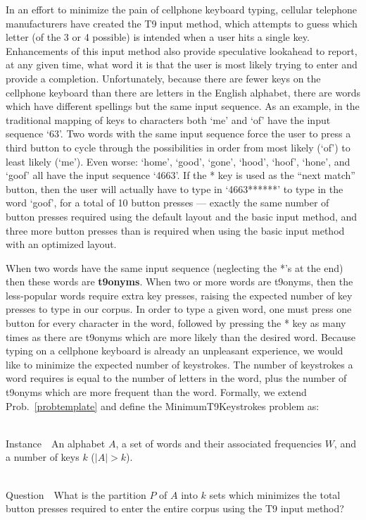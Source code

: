 \documentclass[runningheads]{llncs}
\newcommand{\newword}[1]{{\bf #1}}
\newcommand{\Instance}{{\sc Instance~}}
\newcommand{\Question}{~\\
{\sc Question~}}
\begin{document}
In an effort to minimize the pain of cellphone keyboard typing, cellular
telephone manufacturers have created the T9 input method, which attempts to
guess which letter (of the 3 or 4 possible) is intended when a user hits a
single key.  Enhancements of this input method also provide
speculative lookahead to report, at any given time, what word it is
that the user is most likely trying to enter and provide a completion.
Unfortunately, because there are fewer keys on the cellphone keyboard than
there are letters in the English alphabet, there are words which have different
spellings but the same input sequence.  As an example, in the traditional
mapping of keys to characters both `me' and `of' have the input sequence
`63'.  Two words with the same input sequence force the user to press a third
button to cycle through the possibilities in order from most likely (`of') to
least likely (`me').  Even worse: `home', `good', `gone', `hood',
`hoof', `hone', and `goof' all have the input sequence `4663'.  If
the * key is used as the ``next match'' button, then the user will actually
have to type in `4663******' to type in the word `goof', for a total of 10
button presses --- exactly the same number of button presses required using the
default layout and the basic input method, and three more button presses than
is required when using the basic input method with an optimized layout.

When two words have the same input sequence (neglecting the *'s at the end)
then these words are \newword{t9onyms}.  When two or more words are t9onyms,
then the less-popular words require extra key presses, raising the expected
number of key presses to type in our corpus.  In order to type a given word, one
must press one button for every character in the word, followed by pressing
the * key as many times as there are t9onyms which are more likely than the
desired word.  Because typing on a cellphone keyboard is already an unpleasant
experience, we would like to minimize the expected number of keystrokes.  The
number of keystrokes a word requires is equal to the number of letters in the
word, plus the number of t9onyms which are more frequent than the word.
Formally, we extend Prob.~\ref{probtemplate} and define the {\sc
MinimumT9Keystrokes} problem as:

\begin{prob}~\\
\label{thm:minstrokes}
\Instance\ An alphabet $A$, a set of words and their associated frequencies
$W$, and a number of keys $k$ ($|A| > k$).

\Question\ What is the partition $P$ of $A$ into $k$ sets which minimizes the
total button presses required to enter the entire corpus using the T9 input
method?
\end{prob}
\end{document}
